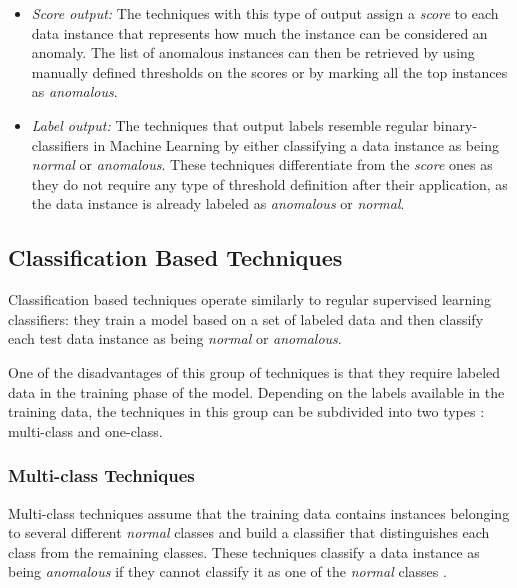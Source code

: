 \begin{itemize}
	\item \textit{Score output:} The techniques with this type of output assign a \textit{score} to each data instance that represents how much the instance can be considered an anomaly. The list of anomalous instances can then be retrieved by using manually defined thresholds on the scores or by marking all the top instances as \textit{anomalous}.
	
	\item \textit{Label output:} The techniques that output labels resemble regular binary-classifiers in Machine Learning by either classifying a data instance as being \textit{normal} or \textit{anomalous}. These techniques differentiate from the \textit{score} ones as they do not require any type of threshold definition after their application, as the data instance is already labeled as \textit{anomalous} or \textit{normal}.
\end{itemize}

\subsection{Classification Based Techniques}

Classification based techniques operate similarly to regular supervised learning classifiers: they train a model based on a set of labeled data and then classify each test data instance as being \textit{normal} or \textit{anomalous}.

One of the disadvantages of this group of techniques is that they require labeled data in the training phase of the model. Depending on the labels available in the training data, the techniques in this group can be subdivided into two types \cite{Kandhari2009}: multi-class and one-class.


\subsubsection{Multi-class Techniques}\mbox{}

Multi-class techniques assume that the training data contains instances belonging to several different \textit{normal} classes and build a classifier that distinguishes each class from the remaining classes. These techniques classify a data instance as being \textit{anomalous} if they cannot classify it as one of the \textit{normal} classes \cite{Kandhari2009}.

